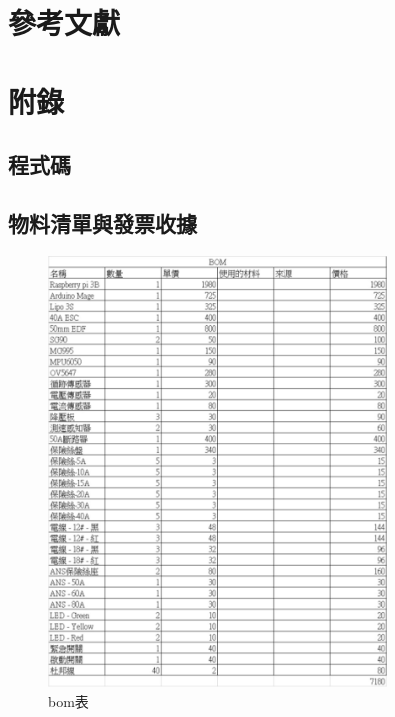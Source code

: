 \documentclass[12pt]{article}       %
\begin{document}




\section{\centering 參考文獻}
\renewcommand{\refname}{}  %
\printbibliography  %

\section{\centering 附錄}

\subsection{程式碼} 
\hspace{2em}

\subsection{物料清單與發票收據} 
\hspace{2em}
\begin{figure}[H]
    \centering
    \includegraphics[width=0.8\textwidth]{8.jpg}     %
    \caption{bom表}    %
    \label{fig:8}    %
\end{figure}
\end{document}
